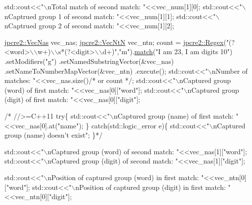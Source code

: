 \begin{DoxyCode}
std::cout<<\textcolor{stringliteral}{"\(\backslash\)nTotal match of second match: "}<<vec\_num[1][0];      
std::cout<<\textcolor{stringliteral}{"\(\backslash\)nCaptrued group 1 of second match: "}<<vec\_num[1][1]; 
std::cout<<\textcolor{stringliteral}{"\(\backslash\)nCaptrued group 2 of second match: "}<<vec\_num[1][2]; 



\hyperlink{namespacejpcre2_a2b121ae776ea5b2913839f418a7d856b}{jpcre2::VecNas} vec\_nas;
\hyperlink{namespacejpcre2_a88a7aaf84cad627d34c8152e726168eb}{jpcre2::VecNtN} vec\_ntn; 
count = 
\hyperlink{classjpcre2_1_1Regex}{jpcre2::Regex}(\textcolor{stringliteral}{"(?<word>\(\backslash\)\(\backslash\)w+)\(\backslash\)\(\backslash\)s*(?<digit>\(\backslash\)\(\backslash\)d+)"},\textcolor{stringliteral}{"m"}).\hyperlink{classjpcre2_1_1Regex_ab93775a93a0a537d09b9e9ab4a5a3894}{match}(\textcolor{stringliteral}{"I am 23, I am digits 10"})
                                                    .setModifiers(\textcolor{stringliteral}{"g"})
                                                    .setNamedSubstringVector(&vec\_nas)
                                                    .setNameToNumberMapVector(&vec\_ntn) 
                                                    .execute();
std::cout<<\textcolor{stringliteral}{"\(\backslash\)nNumber of matches: "}<<vec\_nas.size()\textcolor{comment}{/* or count */};
std::cout<<\textcolor{stringliteral}{"\(\backslash\)nCaptured group (word) of first match: "}<<vec\_nas[0][\textcolor{stringliteral}{"word"}];
std::cout<<\textcolor{stringliteral}{"\(\backslash\)nCaptured group (digit) of first match: "}<<vec\_nas[0][\textcolor{stringliteral}{"digit"}];

\textcolor{comment}{/* //>=C++11}
\textcolor{comment}{try\{}
\textcolor{comment}{    std::cout<<"\(\backslash\)nCaptured group (name) of first match: "<<vec\_nas[0].at("name");}
\textcolor{comment}{\} catch(std::logic\_error e)\{}
\textcolor{comment}{    std::cout<<"\(\backslash\)nCaptured group (name) doesn't exist";}
\textcolor{comment}{\}*/}

std::cout<<\textcolor{stringliteral}{"\(\backslash\)nCaptured group (word) of second match: "}<<vec\_nas[1][\textcolor{stringliteral}{"word"}];
std::cout<<\textcolor{stringliteral}{"\(\backslash\)nCaptured group (digit) of second match: "}<<vec\_nas[1][\textcolor{stringliteral}{"digit"}];

std::cout<<\textcolor{stringliteral}{"\(\backslash\)nPosition of captured group (word) in first match: "}<<vec\_ntn[0][\textcolor{stringliteral}{"word"}];
std::cout<<\textcolor{stringliteral}{"\(\backslash\)nPosition of captured group (digit) in first match: "}<<vec\_ntn[0][\textcolor{stringliteral}{"digit"}];


\end{DoxyCode}
